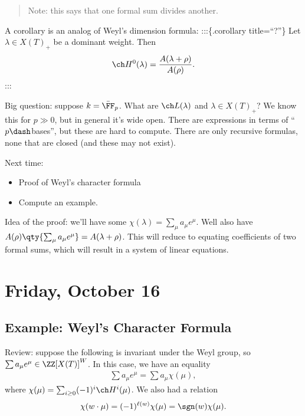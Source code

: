\begin{quote}
Note: this says that one formal sum divides another.
\end{quote}

A corollary is an analog of Weyl's dimension formula: :::\{.corollary
title=``?''\} Let \(\lambda \in X(T)_+\) be a dominant weight. Then
\begin{align*}  
\ch H^0(\lambda) = { A(\lambda + \rho) \over A(\rho) }
.\end{align*} :::

Big question: suppose \(k = \bar{\FF}_p\). What are \(\ch L(\lambda)\)
and \(\lambda \in X(T)_+\)? We know this for \(p\gg 0\), but in general
it's wide open. There are expressions in terms of ``\(p\dash\)bases'',
but these are hard to compute. There are only recursive formulas, none
that are closed (and these may not exist).

Next time:

\begin{itemize}
\tightlist
\item
  Proof of Weyl's character formula
\item
  Compute an example.
\end{itemize}

Idea of the proof: we'll have some
\(\chi(\lambda) = \sum_\mu a_\mu e^\mu\). Well also have
\(A(\rho) \qty{ \sum_\mu a_\mu e^\mu } = A(\lambda + \rho)\). This will
reduce to equating coefficients of two formal sums, which will result in
a system of linear equations.

\hypertarget{friday-october-16}{%
\section{Friday, October 16}\label{friday-october-16}}

\hypertarget{example-weyls-character-formula}{%
\subsection{Example: Weyl's Character
Formula}\label{example-weyls-character-formula}}

Review: suppose the following is invariant under the Weyl group, so
\(\sum a_\mu e^\mu \in \ZZ[X(T)]^W\). In this case, we have an equality
\begin{align*}  
\sum a_\mu e^\mu = \sum a_\mu \chi(\mu)
,\end{align*} where \(\chi(\mu) = \sum_{i\geq 0} (-1)^i \ch H^i(\mu)\).
We also had a relation
\begin{align*}  
\chi(w\cdot \mu) = (-1)^{\ell(w)} \chi(\mu) = \sgn(w) \chi(\mu)
.\end{align*}

